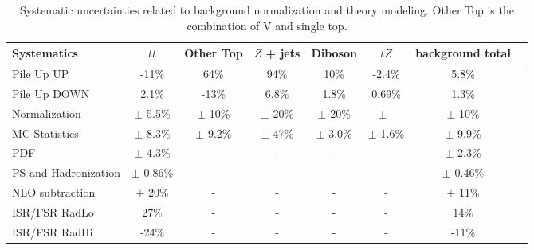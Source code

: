\begin{table} [ht!]
\setlength{\tabcolsep}{2pt}
\footnotesize
\centering
\begin{tabular}{| l | c | c | c | c | c | c | c |}
\hline
\hline
Systematics & $t\bar{t}$ & Other Top & $Z$ + jets & Diboson & $tZ$ & background total \\
\hline
\hline

Pile Up UP & -11\% & 64\% & 94\% & 10\% & -2.4\% & 5.8\% \\
Pile Up DOWN & 2.1\% & -13\% & 6.8\% & 1.8\% & 0.69\% & 1.3\% \\

\hline
Normalization & $\pm $ 5.5\% & $\pm $ 10\% & $\pm $ 20\% & $\pm $ 20\% & $\pm $ - & $\pm $ 10\% \\
\hline

MC Statistics & $\pm $ 8.3\% & $\pm $ 9.2\% & $\pm $ 47\% & $\pm $ 3.0\% & $\pm $ 1.6\% & $\pm $ 9.9\% \\

\hline

PDF & $\pm $ 4.3\% & - & - & - & - & $\pm $ 2.3\% \\
PS and Hadronization & $\pm $ 0.86\% & - & - & - & - & $\pm $ 0.46\% \\
NLO subtraction & $\pm $ 20\% & - & - & - & - & $\pm $ 11\% \\
ISR/FSR RadLo & 27\% & - & - & - & - & 14\% \\
ISR/FSR RadHi & -24\% & - & - & - & - & -11\% \\

\hline
\hline

\end{tabular}
\caption{Systematic uncertainties related to background normalization and theory modeling. Other Top is the combination of \TTB V and single top.}
\label{tab:systematicsMODEL}
\end{table}



\clearpage



